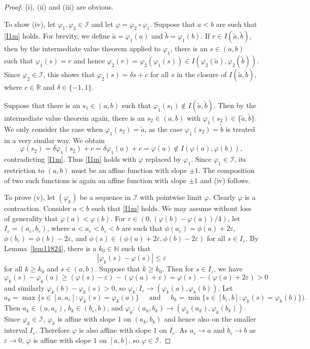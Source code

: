 \documentclass[12pt,reqno]{amsart}
\newcommand{\ee}{\varepsilon}
\newcommand{\N}{{\mathbb N}}
\newcommand{\R}{{\mathbb R}}
\newcommand{\cI}{\mathcal I}
\numberwithin{equation}{section}
\begin{document}
\begin{proof}
(i), (ii) and (iii) are obvious.

To show (iv), let $\varphi_1,\varphi_2\in \cI$ and let $\varphi=\varphi_2\circ \varphi_1$. Suppose that $a<b$ are such that \eqref{I1m} holds. For brevity, we define $\tilde a=\varphi_1(a)$ and $\tilde b=\varphi_1(b)$. If $r\in I(\tilde a, \tilde b)$, then by the intermediate value theorem applied to $\varphi_1$, there is an $s\in (a,b)$ such that $\varphi_1(s)=r$ and hence $\varphi_2(r)=\varphi_2(\varphi_1(s))\in I(\varphi_2(\tilde a),\varphi_2(\tilde b))$.  Since $\varphi_2\in \cI$, this shows that $\varphi_2(s)=\delta s+c$
for all $s$ in the closure of $I(\tilde a, \tilde b)$, where $c\in \R$ and $\delta\in \{-1,1\}$.

Suppose that there is an $s_1\in (a,b)$ such that  $\varphi_1(s_1)\not\in I(\tilde a, \tilde b)$. Then by the intermediate value theorem again, there is an $s_2\in (a,b)$ with $\varphi_1(s_2)\in \{\tilde a, \tilde b\}$. We only consider the case when $\varphi_1(s_2)=\tilde a$, as the case $\varphi_1(s_2)=\tilde b$ is treated in a very similar way. We obtain
\[
\varphi(s_2)= \delta \varphi_1(s_2)+c=\delta \varphi_1(a)+c=\varphi(a)\not\in I(\varphi(a),\varphi(b)),
\]
contradicting \eqref{I1m}. Thus \eqref{I1m} holds with $\varphi$ replaced by $\varphi_1$.  Since $\varphi_1\in \cI$, its restriction to $(a,b)$ must be an affine function with slope $\pm 1$. The composition of two such functions is again an affine function with slope $\pm 1$ and (iv) follows.

To prove (v), let $(\varphi_k)$ be a sequence in $\cI$ with pointwise limit $\varphi$. Clearly $\varphi$ is a contraction. Consider $a<b$ such that \eqref{I1m} holds. We may assume without loss of generality that $\varphi(a)<\varphi(b)$. For $\varepsilon\in (0,(\varphi(b)-\varphi(a))/4)$, let $I_{\ee}=(a_{\ee},b_{\ee})$, where $a<a_\ee<b_\ee<b$ are such that $\phi(a_\ee)=\phi(a)+2\ee$, $\phi(b_\ee)=\phi(b)-2\ee$, and $\phi(s)\in(\phi(a)+2\ee, \phi(b)-2\ee)$ for all $s\in I_\ee$.  By Lemma~\ref{lem11824}, there is a $k_0\in \N$ such that
\[
|\varphi_k(s)-\varphi(s)|\le \varepsilon
\]
for all $k\ge k_0$ and $s\in (a,b)$. Suppose that $k\ge k_0$.  Then for $s\in I_\ee$, we have
\[
\varphi_k(s)-\varphi_k(a)\ge (\varphi(s)-\varepsilon)  -(\varphi(a)+\varepsilon)= \varphi(s)-(\varphi(a)+2\varepsilon)> 0
\]
and similarly $\varphi_k(b)-\varphi_k(s)>0$, so $\varphi_k: I_\ee \to (\varphi_k(a),\varphi_k(b))$. Let
\[
a_k=\max\{s\in [a,a_\ee]:\varphi_k(s)=\varphi_k(a)\}~~\quad{\text{and}}~~\quad
b_k=\min\{s\in [b_\ee,b]:\varphi_k(s)=\varphi_k(b)\}).
\]
Then $a_k\in (a,a_{\ee})$, $b_k\in (b_{\ee},b)$, and
$\varphi_k: (a_k,b_k)\to(\varphi_k(a_k),\varphi_k(b_k))$. Since $\varphi_k\in \cI$, $\varphi_k$ is affine with slope $1$ on $(a_k,b_k)$ and hence also on the smaller interval $I_{\ee}$.
Therefore $\varphi$ is also affine with slope $1$ on $I_\ee$. As $a_\ee\to a$ and $b_\ee\to b$ as $\ee\to 0$, $\varphi$ is affine with slope $1$ on $[a,b]$, so $\varphi\in\cI$.
\end{proof}
\end{document}
